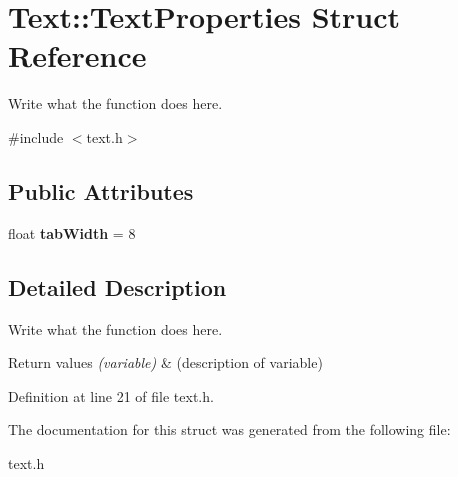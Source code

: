 \hypertarget{structText_1_1TextProperties}{\section{Text\+:\+:Text\+Properties Struct Reference}
\label{structText_1_1TextProperties}
}


Write what the function does here.  




{\ttfamily \#include $<$text.\+h$>$}

\subsection*{Public Attributes}
\begin{DoxyCompactItemize}
\item 
\hypertarget{structText_1_1TextProperties_a44233dc1053dea188f86428a2768b46c}{float {\bfseries tab\+Width} = 8}\label{structText_1_1TextProperties_a44233dc1053dea188f86428a2768b46c}

\end{DoxyCompactItemize}


\subsection{Detailed Description}
Write what the function does here. 


\begin{DoxyRetVals}{Return values}
{\em (variable)} & (description of variable) \\
\hline
\end{DoxyRetVals}


Definition at line 21 of file text.\+h.



The documentation for this struct was generated from the following file\+:\begin{DoxyCompactItemize}
\item 
text.\+h\end{DoxyCompactItemize}
